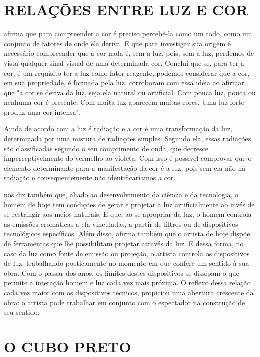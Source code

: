 \section{RELAÇÕES ENTRE LUZ E COR}

 afirma que para compreender a cor é preciso percebê-la como um todo, como um conjunto de fatores de onde ela deriva. E que para investigar sua origem é necessário compreender que a cor nada é, sem a luz, pois, sem a luz, perdemos de vista qualquer sinal visual de uma determinada cor. Conclui que se, para ter a cor, é um requisito ter a luz como fator reagente, podemos considerar que a cor, em sua propriedade, é formada pela luz.  corroboram com essa idéia ao afirmar que "a cor se deriva da luz, seja ela natural ou artificial. Com pouca luz, pouca ou nenhuma cor é presente. Com muita luz aparecem muitas cores. Uma luz forte produz uma cor intensa". 

Ainda de acordo com  a luz é radiação e a cor é uma transformação da luz, determinada por uma mistura de radiações simples. Segundo ela, essas radiações são classificadas segundo o seu comprimento de onda, que decresce imperceptivelmente do vermelho ao violeta. Com isso é possível comprovar que o elemento determinante para a manifestação da cor é a luz, pois sem ela não há radiação e consequentemente não identificaríamos a cor.

 nos diz também que, aliado ao desenvolvimento da ciência e da tecnologia, o homem de hoje tem condições de gerar e projetar a luz artificialmente ao invés de se restringir aos meios naturais. E que, ao se apropriar da luz, o homem controla as emissões cromáticas a ela vinculadas, a partir de filtros ou de dispositivos tecnológicos específicos. Além disso,  afirma também que o artista de hoje dispõe de ferramentas que lhe possibilitam projetar através da luz. E dessa forma, no caso da luz como fonte de emissão ou projeção, o artista controla os dispositivos de luz, trabalhando poeticamente no momento em que confere um sentido à sua obra. Com o passar dos anos, os limites destes dispositivos se dissipam o que permite a interação homem e luz cada vez mais próxima. O reflexo dessa relação cada vez maior com os dispositivos técnicos, propiciou uma abertura crescente da obra: o artista pode trabalhar em conjunto com o espectador na construção de seu sentido.


\section{O CUBO PRETO}

